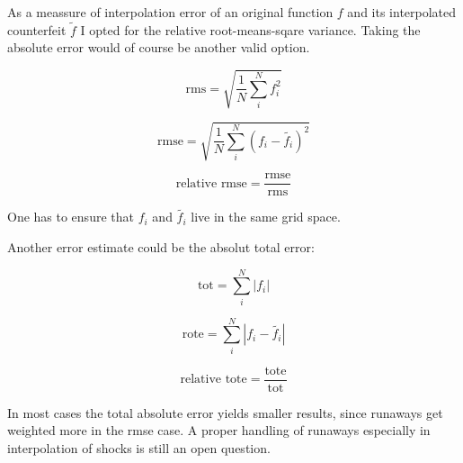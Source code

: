 As a meassure of interpolation error of an original function $f$ and its
interpolated counterfeit $\widetilde{f}$ I opted for the relative
root-means-sqare variance. Taking the absolute error would of course be another
valid option.

\begin{equation}
    \text{rms} = \sqrt{\frac{1}{N} \sum^N_i f^2_i} 
\end{equation}

\begin{equation}
    \text{rmse} = \sqrt{\frac{1}{N} \sum^N_i (f_i - \widetilde{f_i})^2} 
\end{equation}

\begin{equation}
    \text{relative rmse} = \frac{\text{rmse}}{\text{rms}} 
\end{equation}

One has to ensure that $f_i$ and $\widetilde{f_i}$ live in the same grid space.

Another error estimate could be the absolut total error:

\begin{equation}
    \text{tot} = \sum^N_i |f_i|
\end{equation}

\begin{equation}
    \text{rote} = \sum^N_i |f_i - \widetilde{f_i}|
\end{equation}

\begin{equation}
    \text{relative tote} = \frac{\text{tote}}{\text{tot}} 
\end{equation}

In most cases the total absolute error yields smaller results, since runaways
get weighted more in the rmse case. A proper handling of runaways especially in
interpolation of shocks is still an open question.


